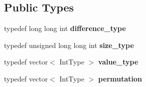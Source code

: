 \subsection*{Public Types}
\begin{DoxyCompactItemize}
\item 
\hypertarget{classdscr_1_1basic__permutations_ae44b374bf15b6a7feabf3545cf022a65}{typedef long long int {\bfseries difference\-\_\-type}}\label{classdscr_1_1basic__permutations_ae44b374bf15b6a7feabf3545cf022a65}

\item 
\hypertarget{classdscr_1_1basic__permutations_ae85ee313c2f3b80625419877155175dd}{typedef unsigned long long int {\bfseries size\-\_\-type}}\label{classdscr_1_1basic__permutations_ae85ee313c2f3b80625419877155175dd}

\item 
\hypertarget{classdscr_1_1basic__permutations_ae0e9936b6638ba3ee2599cf58d47e6e9}{typedef vector$<$ Int\-Type $>$ {\bfseries value\-\_\-type}}\label{classdscr_1_1basic__permutations_ae0e9936b6638ba3ee2599cf58d47e6e9}

\item 
\hypertarget{classdscr_1_1basic__permutations_ab809907a9e41f5f3b21a34ff476e7547}{typedef vector$<$ Int\-Type $>$ {\bfseries permutation}}\label{classdscr_1_1basic__permutations_ab809907a9e41f5f3b21a34ff476e7547}

\end{DoxyCompactItemize}
